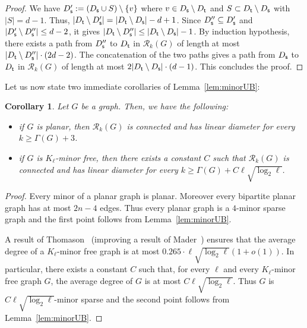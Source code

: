\documentclass[10pt]{article}
\newtheorem{corollary}[theorem]{Corollary}
\newcommand{\source}{{\sf s}}
\newcommand{\target}{{\sf t}}
\begin{document}
\begin{proof}
We have $D_\source':= (D_\source \cup S) \setminus \{v\}$ where $v\in D_\source\setminus D_\target$ and $S\subset D_\target\setminus D_\source$ with $|S|=d-1$. Thus, $|D_\target \setminus D_\source '|=|D_\target \setminus D_\source|-d+1$. Since $D_\source''\subseteq D_\source'$ and $|D_\source'\setminus D_\source''|\leq d-2$, it gives $|D_\target \setminus D_\source''|\leq |D_\target \setminus D_\source|-1$. By induction hypothesis, there exists a path from $D_\source''$ to $D_\target$ in $\mathcal{R}_k(G)$ of length at most $|D_\target \setminus D_\source''|\cdot(2d-2)$. The concatenation of the two paths gives a path from $D_\source$ to $D_\target$ in $\mathcal{R}_k(G)$ of length at most $2|D_\target \setminus D_\source|\cdot(d-1)$. This concludes the proof.
\end{proof}

 Let us now state two immediate corollaries of Lemma~\ref{lem:minorUB}: 
 
\begin{corollary}\label{coro:minor}
Let $G$ be a graph. Then, we have the following:
\begin{itemize}
    \item if $G$ is planar, then $\mathcal{R}_{k}(G)$ is connected and has linear diameter for every $k \ge \Gamma(G)+3$.
    \item if $G$ is $K_\ell$-minor free, then there exists a constant $C$ such that $\mathcal{R}_k(G)$ is connected and has linear diameter for every $k \ge \Gamma(G)+C \ell \sqrt{\log_2 \ell}$.
\end{itemize}
\end{corollary}

\begin{proof}
Every minor of a planar graph is planar. Moreover every bipartite planar graph has at most $2n-4$ edges. Thus every planar graph is a $4$-minor sparse graph and the first point follows from Lemma~\ref{lem:minorUB}.

A result of Thomason~\cite{thomason84} (improving a result of Mader~\cite{Mader68}) ensures that the average degree of a  $K_\ell$-minor free graph is at most $0.265 \cdot\ell \sqrt{\log_2 \ell}(1 + o(1))$. In particular, there exists a constant $C$ such that, for every $\ell$ and every $K_\ell$-minor free graph $G$, the average degree of $G$ is at most $C \ell \sqrt{\log_2 \ell}$. Thus $G$ is $C \ell \sqrt{\log_2 \ell}$-minor sparse and the second point follows from  Lemma~\ref{lem:minorUB}.
\end{proof}
\end{document}
